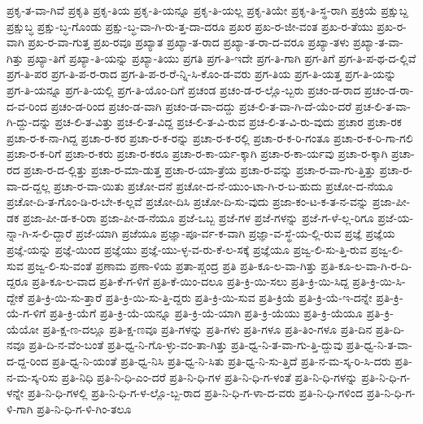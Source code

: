 {ಪ್ರಕೃ-ತ-ವಾ-ಗಿವೆ
ಪ್ರಕೃತಿ
ಪ್ರಕೃ-ತಿಯ
ಪ್ರಕೃ-ತಿ-ಯನ್ನೂ
ಪ್ರಕೃ-ತಿ-ಯಲ್ಲ
ಪ್ರಕೃ-ತಿಯೇ
ಪ್ರಕೃ-ತಿ-ಸ್ಥ-ರಾಗಿ
ಪ್ರಕ್ರಿಯೆ
ಪ್ರಕ್ಷುಬ್ದ
ಪ್ರಕ್ಷುಬ್ಧ
ಪ್ರಕ್ಷು-ಬ್ಧ-ಗೊಂಡು
ಪ್ರಕ್ಷು-ಬ್ಧ-ವಾ-ಗಿ-ರು-ತ್ತ-ದಾ-ದರೂ
ಪ್ರಖರ
ಪ್ರಖ-ರ-ಜೀ-ವಂತ
ಪ್ರಖ-ರ-ತೆಯು
ಪ್ರಖ-ರ-ವಾಗಿ
ಪ್ರಖ-ರ-ವಾ-ಗುತ್ತ
ಪ್ರಖ-ರವೂ
ಪ್ರಖ್ಯಾತ
ಪ್ರಖ್ಯಾ-ತ-ರಾದ
ಪ್ರಖ್ಯಾ-ತ-ರಾ-ದ-ವರೂ
ಪ್ರಖ್ಯಾ-ತಳು
ಪ್ರಖ್ಯಾ-ತ-ವಾ-ಗಿತ್ತು
ಪ್ರಖ್ಯಾ-ತಿಗೆ
ಪ್ರಖ್ಯಾ-ತಿ-ಯನ್ನು
ಪ್ರಖ್ಯಾ-ತಿಯು
ಪ್ರಗತಿ
ಪ್ರಗ-ತಿ-ಇದೇ
ಪ್ರಗ-ತಿ-ಗಾಗಿ
ಪ್ರಗ-ತಿಗೆ
ಪ್ರಗ-ತಿ-ಪ-ಥ-ದ-ಲ್ಲಿವೆ
ಪ್ರಗ-ತಿ-ಪರ
ಪ್ರಗ-ತಿ-ಪ-ರ-ರಾದ
ಪ್ರಗ-ತಿ-ಪ-ರ-ರೆ-ನ್ನಿ-ಸಿ-ಕೊಂ-ಡ-ವರು
ಪ್ರಗ-ತಿಯ
ಪ್ರಗ-ತಿ-ಯತ್ತ
ಪ್ರಗ-ತಿ-ಯನ್ನು
ಪ್ರಗ-ತಿ-ಯನ್ನೂ
ಪ್ರಗ-ತಿ-ಯಲ್ಲಿ
ಪ್ರಗ-ತಿ-ಯೊಂ-ದಿಗೆ
ಪ್ರಚಂಡ
ಪ್ರಚಂ-ಡ-ರ-ಲ್ಲೊ-ಬ್ಬರು
ಪ್ರಚಂ-ಡ-ರಾದ
ಪ್ರಚಂ-ಡ-ರಾ-ದ-ವ-ರಿಂದ
ಪ್ರಚಂ-ಡ-ರಿಂದ
ಪ್ರಚಂ-ಡ-ವಾಗಿ
ಪ್ರಚಂ-ಡ-ವಾ-ದದ್ದು
ಪ್ರಚ-ಲಿ-ತ-ವಾ-ಗಿ-ದೆ-ಯೆಂ-ದರೆ
ಪ್ರಚ-ಲಿ-ತ-ವಾ-ಗಿ-ದ್ದು-ದನ್ನು
ಪ್ರಚ-ಲಿ-ತ-ವಿತ್ತು
ಪ್ರಚ-ಲಿ-ತ-ವಿದ್ದ
ಪ್ರಚ-ಲಿ-ತ-ವಿ-ರುವ
ಪ್ರಚ-ಲಿ-ತ-ವಿ-ರು-ವುದು
ಪ್ರಚಾರ
ಪ್ರಚಾ-ರಕ
ಪ್ರಚಾ-ರ-ಕ-ನಾ-ಗಿದ್ದ
ಪ್ರಚಾ-ರ-ಕರ
ಪ್ರಚಾ-ರ-ಕ-ರನ್ನು
ಪ್ರಚಾ-ರ-ಕ-ರಲ್ಲಿ
ಪ್ರಚಾ-ರ-ಕ-ರಿ-ಗಂತೂ
ಪ್ರಚಾ-ರ-ಕ-ರಿ-ಗಾ-ಗಲಿ
ಪ್ರಚಾ-ರ-ಕ-ರಿಗೆ
ಪ್ರಚಾ-ರ-ಕರು
ಪ್ರಚಾ-ರ-ಕರೂ
ಪ್ರಚಾ-ರ-ಕಾ-ರ್ಯ-ಕ್ಕಾಗಿ
ಪ್ರಚಾ-ರ-ಕಾ-ರ್ಯವು
ಪ್ರಚಾ-ರ-ಕ್ಕಾಗಿ
ಪ್ರಚಾ-ರದ
ಪ್ರಚಾ-ರ-ದ-ಲ್ಲಿತ್ತು
ಪ್ರಚಾ-ರ-ಮಾ-ಡುತ್ತ
ಪ್ರಚಾ-ರ-ಯಾ-ತ್ರೆಯ
ಪ್ರಚಾ-ರ-ವನ್ನು
ಪ್ರಚಾ-ರ-ವಾ-ಗು-ತ್ತಿತ್ತು
ಪ್ರಚಾ-ರ-ವಾ-ದ-ದ್ದಲ್ಲ
ಪ್ರಚಾ-ರ-ವಾ-ಯಿತು
ಪ್ರಚೋ-ದನೆ
ಪ್ರಚೋ-ದ-ನೆ-ಯುಂ-ಟಾ-ಗಿ-ರ-ಬ-ಹುದು
ಪ್ರಚೋ-ದ-ನೆಯೂ
ಪ್ರಚೋ-ದಿ-ತ-ಗೊಂ-ಡಿ-ರ-ಬೇ-ಕ-ಲ್ಲವೆ
ಪ್ರಚೋ-ದಿಸಿ
ಪ್ರಚೋ-ದಿ-ಸು-ವುದು
ಪ್ರಜಾ-ಕಂ-ಟ-ಕ-ತ-ನ-ವನ್ನು
ಪ್ರಜಾ-ಪೀ-ಡಕ
ಪ್ರಜಾ-ಪೀ-ಡ-ಕ-ರಿರಾ
ಪ್ರಜಾ-ಪೀ-ಡ-ನೆಯೂ
ಪ್ರಜೆ-ಒಬ್ಬ
ಪ್ರಜೆ-ಗಳ
ಪ್ರಜೆ-ಗಳನ್ನು
ಪ್ರಜೆ-ಗ-ಳೆ-ಲ್ಲ-ರಿಗೂ
ಪ್ರಜೆ-ಯ-ನ್ನಾ-ಗಿ-ಸ-ಲಿ-ದ್ದಾರೆ
ಪ್ರಜೆ-ಯಾಗಿ
ಪ್ರಜೆಯೂ
ಪ್ರಜ್ಞಾ-ಪೂ-ರ್ವ-ಕ-ವಾಗಿ
ಪ್ರಜ್ಞಾ-ವ-ಸ್ಥೆ-ಯ-ಲ್ಲಿ-ರುವ
ಪ್ರಜ್ಞೆ
ಪ್ರಜ್ಞೆಯ
ಪ್ರಜ್ಞೆ-ಯನ್ನು
ಪ್ರಜ್ಞೆ-ಯಿಂದ
ಪ್ರಜ್ಞೆಯು
ಪ್ರಜ್ಞೆ-ಯು-ಳ್ಳ-ವ-ರು-ಕೆ-ಲ-ಸಕ್ಕೆ
ಪ್ರಜ್ಞೆಯೂ
ಪ್ರಜ್ವ-ಲಿ-ಸು-ತ್ತಿ-ರುವ
ಪ್ರಜ್ವ-ಲಿ-ಸುವ
ಪ್ರಜ್ವ-ಲಿ-ಸು-ವಂತೆ
ಪ್ರಣಾಮ
ಪ್ರಣಾ-ಳಿಯ
ಪ್ರತಾ-ಪ್ಚಂದ್ರ
ಪ್ರತಿ
ಪ್ರತಿ-ಕೂ-ಲ-ವಾ-ಗಿತ್ತು
ಪ್ರತಿ-ಕೂ-ಲ-ವಾ-ಗಿ-ರ-ದಿ-ದ್ದರೂ
ಪ್ರತಿ-ಕೂ-ಲ-ವಾದ
ಪ್ರತಿ-ಕೆ-ಗ-ಳಿಗೆ
ಪ್ರತಿ-ಕೆ-ಯಿಂ-ದಲೂ
ಪ್ರತಿ-ಕ್ರಿ-ಯಿ-ಸಲು
ಪ್ರತಿ-ಕ್ರಿ-ಯಿ-ಸಿದ್ದ
ಪ್ರತಿ-ಕ್ರಿ-ಯಿ-ಸಿ-ದ್ದೇಕೆ
ಪ್ರತಿ-ಕ್ರಿ-ಯಿ-ಸು-ತ್ತಾರೆ
ಪ್ರತಿ-ಕ್ರಿ-ಯಿ-ಸು-ತ್ತಿ-ದ್ದರು
ಪ್ರತಿ-ಕ್ರಿ-ಯಿ-ಸುವ
ಪ್ರತಿ-ಕ್ರಿಯೆ
ಪ್ರತಿ-ಕ್ರಿ-ಯೆ-ಇ-ದನ್ನೇ
ಪ್ರತಿ-ಕ್ರಿ-ಯೆ-ಗ-ಳಿಗೆ
ಪ್ರತಿ-ಕ್ರಿ-ಯೆಗೆ
ಪ್ರತಿ-ಕ್ರಿ-ಯೆ-ಯನ್ನೂ
ಪ್ರತಿ-ಕ್ರಿ-ಯೆ-ಯಾಗಿ
ಪ್ರತಿ-ಕ್ರಿ-ಯೆಯು
ಪ್ರತಿ-ಕ್ರಿ-ಯೆಯೂ
ಪ್ರತಿ-ಕ್ರಿ-ಯೆಯೋ
ಪ್ರತಿ-ಕ್ಷ-ಣ-ದಲ್ಲೂ
ಪ್ರತಿ-ಕ್ಷ-ಣವೂ
ಪ್ರತಿ-ಗಳನ್ನು
ಪ್ರತಿ-ಗಳು
ಪ್ರತಿ-ಗಳೂ
ಪ್ರತಿ-ತಿಂ-ಗಳೂ
ಪ್ರತಿ-ದಿನ
ಪ್ರತಿ-ದಿ-ನವೂ
ಪ್ರತಿ-ದಿ-ನ-ವೆಂ-ಬಂತೆ
ಪ್ರತಿ-ಧ್ವ-ನಿ-ಗೊ-ಳ್ಳು-ವಂ-ತಾ-ಗಿತ್ತು
ಪ್ರತಿ-ಧ್ವ-ನಿ-ತ-ವಾ-ಗು-ತ್ತಿ-ದ್ದುವು
ಪ್ರತಿ-ಧ್ವ-ನಿ-ತ-ವಾ-ದ-ದ್ದ-ರಿಂದ
ಪ್ರತಿ-ಧ್ವ-ನಿ-ಯಂತೆ
ಪ್ರತಿ-ಧ್ವ-ನಿಸಿ
ಪ್ರತಿ-ಧ್ವ-ನಿ-ಸಿತು
ಪ್ರತಿ-ಧ್ವ-ನಿ-ಸು-ತ್ತಿದೆ
ಪ್ರತಿ-ನ-ಮ-ಸ್ಕ-ರಿ-ಸಿ-ದರು
ಪ್ರತಿ-ನ-ಮ-ಸ್ಕ-ರಿಸು
ಪ್ರತಿ-ನಿಧಿ
ಪ್ರತಿ-ನಿ-ಧಿ-ಎಂ-ದರೆ
ಪ್ರತಿ-ನಿ-ಧಿ-ಗಳ
ಪ್ರತಿ-ನಿ-ಧಿ-ಗ-ಳಂತೆ
ಪ್ರತಿ-ನಿ-ಧಿ-ಗಳನ್ನು
ಪ್ರತಿ-ನಿ-ಧಿ-ಗ-ಳನ್ನೇ
ಪ್ರತಿ-ನಿ-ಧಿ-ಗಳಲ್ಲಿ
ಪ್ರತಿ-ನಿ-ಧಿ-ಗ-ಳ-ಲ್ಲೊ-ಬ್ಬ-ರಾದ
ಪ್ರತಿ-ನಿ-ಧಿ-ಗ-ಳಾ-ದ-ವರು
ಪ್ರತಿ-ನಿ-ಧಿ-ಗಳಿಂದ
ಪ್ರತಿ-ನಿ-ಧಿ-ಗ-ಳಿ-ಗಾಗಿ
ಪ್ರತಿ-ನಿ-ಧಿ-ಗ-ಳಿ-ಗಿಂ-ತಲೂ
}
